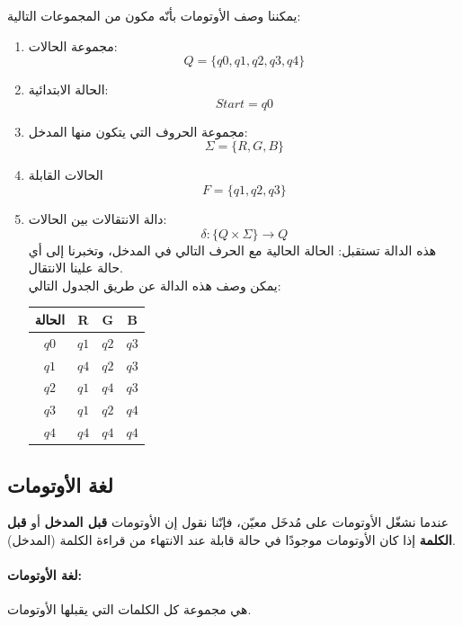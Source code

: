 ﻿\documentclass[12pt]{article}
\begin{document}
يمكننا وصف الأوتومات بأنّه مكون من المجموعات التالية:

\begin{enumerate}
    \item مجموعة الحالات:
    $$Q = \{q0, q1, q2, q3, q4\}$$

    \item الحالة الابتدائية:
    $$Start = q0$$

    \item مجموعة الحروف التي يتكون منها المدخل:
    $$ \Sigma = \{R,G,B\}$$

    \item الحالات القابلة
    $$ F = \{q1, q2, q3\}$$

    \item دالة الانتقالات بين الحالات:
    $$\delta: \{Q \times \Sigma \} \to Q$$
    هذه الدالة تستقبل: الحالة الحالية مع الحرف التالي في المدخل، وتخبرنا إلى أي حالة علينا الانتقال. \\
    يمكن وصف هذه الدالة عن طريق الجدول التالي:
    \begin{table}[h]
    \centering
    \begin{tabular}{|c|c|c|c|}
    \hline
    \textbf{الحالة} & \textbf{R} & \textbf{G} & \textbf{B} \\
    \hline
    $q0$ & $q1$ & $q2$ & $q3$ \\
    \hline
    $q1$ & $q4$ & $q2$ & $q3$ \\
    \hline
    $q2$ & $q1$ & $q4$ & $q3$ \\
    \hline
    $q3$ & $q1$ & $q2$ & $q4$ \\
    \hline
    $q4$ & $q4$ & $q4$ & $q4$ \\
    \hline
    \end{tabular}
    \end{table}
\end{enumerate}

\subsection{لغة الأوتومات}

عندما نشغّل الأوتومات على مُدخَل معيّن، فإنّنا نقول إن الأوتومات \textbf{قبل المدخل} أو \textbf{قبل الكلمة} إذا كان الأوتومات موجودًا في حالة قابلة عند الانتهاء من قراءة الكلمة (المدخل).

\paragraph{لغة الأوتومات: } هي مجموعة كل الكلمات التي يقبلها الأوتومات.
\end{document}
